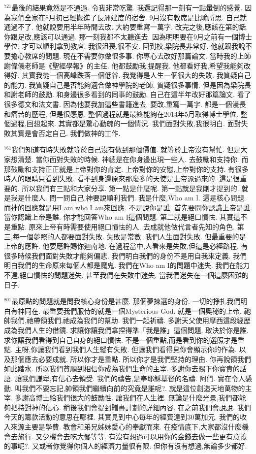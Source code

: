 \documentclass{book}
\begin{document}
$^{721}$最後的結果竟然是不通過.
令我非常吃驚.
我還記得那一刻有一點暈倒的感覺.
因為我們全家在8月初已經搬進了長洲建度的宿舍.
9月沒有教席是比喻所思.
自己就通過不了.
他就說要用半年時間去改.
大約要重寫一萬字.
改完之後,應該在第的話.
你跟足改,應該可以通過.
那一刻我都不太聽進去.
因為明明要在9月之前有一個博士學位.
才可以順利拿到教席.
我很沮喪,很不安.
回到校,梁院長非常好.
他就跟我說不要擔心教席的問題.
現在不需要你做很多事.
你專心去改好那篇論文.
當時我的上師謝偉儀老師是《聖經學報》的主任.
他都鼓勵我,提醒我.
他都看好我,希望我能夠改得好.
其實我從一個高峰跌落一個低谷.
我覺得是人生一個很大的失敗.
我質疑自己的能力.
我質疑自己是否能夠適合做神學院的老師.
質疑很多事情.
但是因為梁院長和謝老師的鼓勵.
和身邊很多看到的同事的鼓勵.
自己在這半年改好那篇論文.
看了很多德文和法文書.
因為他要我加這些書籍進去.
要改,重寫一萬字.
都是一個漫長和痛苦的歷程.
但是很感恩.
整個過程就是最終能夠在2014年5月取得博士學位.
整個過程,回想起來.
其實都是驚心動魄的一個情況.
我們面對失敗,我很明白.
面對失敗其實是會否定自己.
我們做神的工作.

$^{761}$我們知道有時失敗就等於自己沒有做到那個價值.
就等於上帝沒有幫忙.
但是大家想清楚.
當你面對失敗的時候.
神總是在你身邊出現一些人.
去鼓勵和支持你.
而那鼓勵和支持正正就是上帝對你的肯定.
上帝對你的安慰,上帝對你的支持.
有很多時人的眼睛只看到失敗.
看不到身邊原來那麼多的天使是上帝派過來的.
這是很重要的.
所以我們有三點和大家分享.
第一點是什麼呢.
第一點就是我剛才提到的.
就是我是什麼人.
問一問自己,神要說順利我們.
我是什麼,Who am I.
這是核心問題.
而神的回應就是用I am who I am來回應.
不是說你是誰.
首先要問你認識上帝是誰.
當你認識上帝是誰.
你才能回答Who am I這個問題.
第二就是絕口憤怯.
其實這不是重點.
原來上帝有時需要使用絕口憤怯的人.
去成就他做代言者先知的角色.
第三,每一個夢照的人都要面對失敗.
失敗是常數.
我們人生面對失敗.
但最重要的是上帝的應許.
他要應許賜你迦南地.
在過程當中,人看來是失敗,但這是必經路程.
有很多時候我們面對失敗才能夠偏悲.
我們明白我們的身份不是用自我來定義.
我們明白我們的生命原來每個人都是魔鬼.
我們在Who am I的問題中迷失.
我們在能力不達,絕口憤怯的問題迷失.
甚至我們在失敗中迷失.
當我們迷失在一個這麼困難的日子.

$^{801}$最原點的問題就是問我核心身份是甚麼.
那個夢揀選的身份.
一切的掙扎我們明白有神同在.
最重要我們服侍的就是一個Mysterious God.
就是一個奧秘的上帝.
祂帥我們,祂帶領我們,祂成為我們的幫助.
我們一起祈禱.
多謝天父使用摩西這段經歷成為我們人生的借鏡.
求讓你讓我們拿捏得準「我是誰」這個問題.
取決於你是誰.
求你讓我們看得到自己自身的絕口憤怯.
不是一個重點,而是看到你的選照才是重點.
主呀,你讓我們看到我們人生縱有失敗.
但讓我們看得見你會顯示你的作為.
以及那個應去必要成就.
所以你才是重點.
所以你才是我們堅持的理由.
你再說領我們如此踏水.
所以我們貧順到相信你成為我們生命的主宰.
多謝你去賜下你寶貴的話語.
讓我們謙卑,有信心去領受.
我們的禱告,是奉耶穌基督的名禱.
阿們.
實在令人感動.
叫我們不要忘記,帥領我們繼續向前的究竟是誰呢?.
就是這位創造天地萬物的主宰.
多謝高博士給我們很大的鼓勵性.
讓我們在人生裡.
無論是什麼光景,我們都能夠把持對神的信心.
稍後我們會提到贈書計劃的詳細內容.
在之前我們會說說.
我們今天的籌款活動的意思在哪裡.
其實見到中心每年的經費達到30萬加元.
我們的收入來源主要是學費.
教會和弟兄姊妹愛心的奉獻而來.
在疫情底下,大家都沒什麼機會去旅行.
又少機會去吃大餐等等.
有沒有想過可以用你的金錢去做一些更有意義的事呢?.
又或者你覺得你個人的經濟力量很有限.
但你有沒有想過,無論多少都好.
\end{document}
